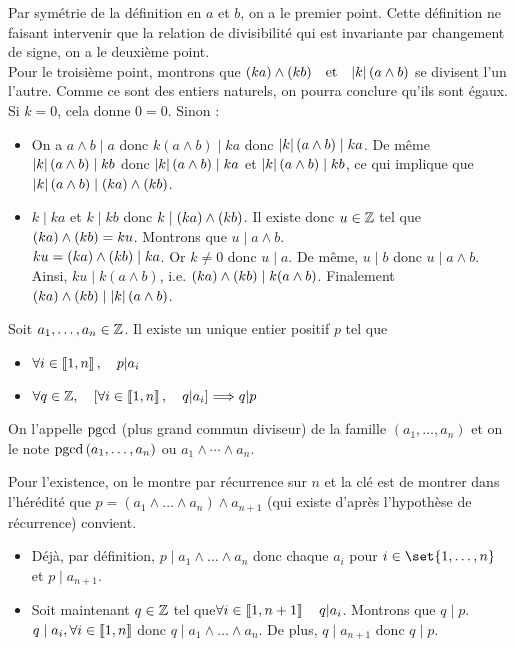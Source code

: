 \documentclass{magnolia}
\begin{document}
\begin{preuve}
Par symétrie de la définition en $a$ et $b$, on a le premier point. Cette définition ne faisant intervenir que la relation de divisibilité qui est invariante par changement de signe, on a le deuxième point.\\
Pour le troisième point, montrons que $\left(ka\right)\wedge\left(kb\right) \quad\!\text{et}\quad\! \left|k\right|\left(a\wedge b\right)$ se divisent l'un l'autre. Comme ce sont des entiers naturels, on pourra conclure qu'ils sont égaux.\\
Si $k=0$, cela donne $0=0$. Sinon :
\begin{itemize}
\item On a $a\wedge b\mid a$ donc $k(a\wedge b)\mid ka$ donc $\left|k\right|\left(a\wedge b\right)\mid ka$. De même $\left|k\right|\left(a\wedge b\right) \mid kb$ donc $\left|k\right|\left(a\wedge b\right)\mid ka$ et $\left|k\right|\left(a\wedge b\right)\mid kb$, ce qui implique que $\left|k\right|\left(a\wedge b\right)\mid \left(ka\right)\wedge\left(kb\right)$.
\item $k\mid ka$ et $k\mid kb$ donc $k\mid \left(ka\right)\wedge\left(kb\right)$. Il existe donc $u\in \mathbb{Z}$ tel que $\left(ka\right)\wedge\left(kb\right)=ku$. Montrons que $u\mid a\wedge b$.\\
$ku=\left(ka\right)\wedge\left(kb\right)\mid ka$. Or $k\neq 0$ donc $u\mid a$. De même, $u\mid b$ donc $u\mid a\wedge b$. Ainsi, $ku\mid k(a\wedge b)$, i.e. $\left(ka\right)\wedge\left(kb\right)\mid k(a\wedge b)$. Finalement $\left(ka\right)\wedge\left(kb\right)\mid \left|k\right|(a\wedge b)$.
\end{itemize}
\end{preuve}

\begin{definition}
Soit $a_1,\ldots,a_n\in\mathbb{Z}$. Il existe un unique entier positif $p$ tel que
\begin{itemize}
\item $\forall i\in\left\llbracket 1,n\right\rrbracket ,\quad p|a_i$
\item $\forall q\in\mathbb{Z} ,\quad \left[\forall i\in\left\llbracket 1,n\right\rrbracket ,\quad q|a_i\right] \Longrightarrow q|p$
\end{itemize}
On l'appelle $\operatorname{pgcd}$ (plus grand commun diviseur) de la famille $(a_1,\ldots,a_n)$ et on le note
$\operatorname{pgcd}\left(a_1,\ldots,a_n\right)$ ou $a_1\wedge\cdots\wedge a_n$.
\end{definition}

\begin{preuve}
Pour l'existence, on le montre par récurrence sur $n$ et la clé est de montrer dans l'hérédité que $p=(a_1\wedge \ldots \wedge a_n)\wedge a_{n+1}$ (qui existe d'après l'hypothèse de récurrence) convient.
\begin{itemize}
\item Déjà, par définition, $p\mid a_1\wedge \ldots \wedge a_n$ donc chaque $a_i$ pour $i\in \set{1,\ldots,n}$ et $p\mid a_{n+1}$.
\item Soit maintenant $q\in\mathbb{Z}$ tel que$\forall i\in\left\llbracket 1,n+1\right\rrbracket \quad q|a_i$. Montrons que $q\mid p$.\\
$q\mid a_i, \forall i\in\left\llbracket 1,n\right\rrbracket$ donc $q\mid a_1\wedge \ldots \wedge a_n$. De plus, $q\mid a_{n+1}$ donc $q\mid p$.
\end{itemize}
\end{preuve}
\end{document}
